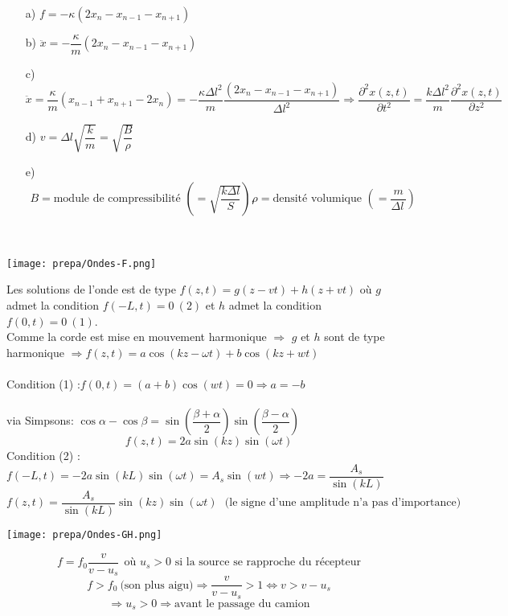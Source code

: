 \documentclass[british,french,11pt, a4paper, openany]{book}
\begin{document}
		\begin{itemize}
			\item[a) ]$f=-\kappa(2x_n-x_{n-1}-x_{n+1})$
			\item[b) ]$\ddot{x}=-\dfrac{\kappa}{m}(2x_n-x_{n-1}-x_{n+1})$
			      
			\item[c) ]$\ddot{x}=\dfrac{\kappa}{m}(x_{n-1}+x_{n+1}-2x_n)=-\dfrac{\kappa\Delta l^2}{m}\dfrac{(2x_n-x_{n-1}-x_{n+1})}{\Delta l^2}\Rightarrow\dfrac{\partial^2 x(z,t)}{\partial t^2}=\dfrac{k\Delta l^2}{m}\dfrac{\partial^2x(z,t)}{\partial z^2}$
			      
			\item[d) ]$v=\Delta l\sqrt{\dfrac{k}{m}}=\sqrt{\dfrac{B}{\rho}}$
			      
			\item[e) ]$\begin{array}{lr}
			      B=\text{module de compressibilité }\left(=\sqrt{\dfrac{k\Delta l}{S}}\right),  & \rho=\text{densité volumique }\left(=\dfrac{m}{\Delta l\,}\right)
			\end{array}$
		\end{itemize}
		\
		\begin{center}
			\texttt{[image: prepa/Ondes-F.png]}\\
		\end{center}
		
		Les solutions de l'onde est de type $f(z,t)=g(z-vt)+h(z+vt)$ où $g$ admet la condition $f(-L,t)=0\ (2)$ et $h$ admet la condition $f(0,t)=0\ (1)$.\\
		Comme la corde est mise en mouvement harmonique $\Rightarrow$ $g$ et $h$ sont de type harmonique $\Rightarrow f(z,t)=a\cos(kz-\omega t)+b\cos(kz+wt)$\\\\
		Condition (1) :$f(0,t)=(a+b)\cos(wt)=0\Rightarrow a=-b$\\\\
		via Simpsons: $\cos\alpha-\cos\beta=\sin\left(\dfrac{\beta+\alpha}{2}\right)\sin\left(\dfrac{\beta-\alpha}{2}\right)$
		$$f(z,t)=2a\sin(kz)\sin(\omega t)$$
		Condition (2) : $f(-L,t)=-2a\sin(kL)\sin(\omega t)=A_s\sin(wt)\Rightarrow-2a=\dfrac{A_s}{\sin(kL)}$
		$$f(z,t)=\frac{A_s}{\sin(kL)}\sin(kz)\sin(\omega t)\ \ \ \text{(le signe d'une amplitude n'a pas d'importance)}$$
		
		\begin{center}
			\texttt{[image: prepa/Ondes-GH.png]}\\
		\end{center}
		$$f=f_0\frac{v}{v-u_s}\ \ \text{où $u_s>0$ si la source se rapproche du récepteur}$$
		$$f>f_0\ \text{(son plus aigu)} \Rightarrow \frac{v}{v-u_s}>1\Leftrightarrow v>v-u_s$$
		$$\Rightarrow u_s>0\Rightarrow\text{avant le passage du camion}$$
		
\end{document}
